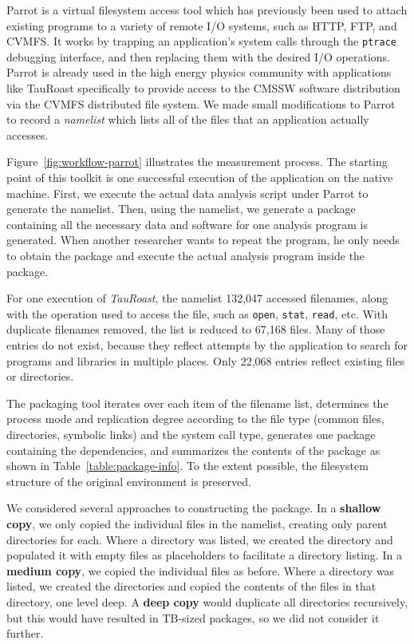 \documentclass{sig-alternate}
\begin{document}
Parrot is a virtual filesystem access tool which has previously been used to attach
existing programs to a variety of remote I/O systems, such as HTTP, FTP, and CVMFS.
It works by trapping an application's system calls through the {\tt ptrace} debugging
interface, and then replacing them with the desired I/O operations.  Parrot is already used
in the high energy physics community with applications like TauRoast specifically to 
provide access to the CMSSW software distribution via the CVMFS distributed file system.
We made small modifications to Parrot to record a \emph{namelist} which lists all 
of the files that an application actually accesses.

Figure~\ref{fig:workflow-parrot} illustrates the measurement process.
The starting point of this toolkit is one successful execution of the application on the native machine.
First, we execute the actual data analysis script under Parrot to generate the namelist.
Then, using the namelist, we generate a package containing all the necessary data
and software for one analysis program is generated. When another
researcher wants to repeat the program, he only needs to obtain the package and
execute the actual analysis program inside the package. 

For one execution of \emph{TauRoast}, the namelist 132,047 accessed filenames,
along with the operation used to access the file, such as {\tt open}, {\tt stat}, {\tt read}, etc.
With duplicate filenames removed, the list is reduced to 67,168 files.
Many of those entries do not exist, because they reflect attempts
by the application to search for programs and libraries in multiple places.
Only 22,068 entries reflect existing files or directories.

The packaging tool iterates over each item of the filename list, determines the process
mode and replication degree according to the file type (common files,
directories, symbolic links) and the system call type, generates one package
containing the dependencies, and summarizes the contents of the package
as shown in Table~\ref{table:package-info}.  To the extent possible,
the filesystem structure of the original environment is preserved.

We considered several approaches to constructing the package.
In a {\bf shallow copy}, we only copied the individual files in the namelist,
creating only parent directories for each.  Where a directory was listed,
we created the directory and populated it with empty files as placeholders
to facilitate a directory listing.  In a {\bf medium copy}, we copied the
individual files as before.  Where a directory was listed, we created
the directories and copied the contents of the files in that directory,
one level deep.  A {\bf deep copy} would duplicate all directories recursively,
but this would have resulted in TB-sized packages, so we did not consider
it further.
\end{document}
